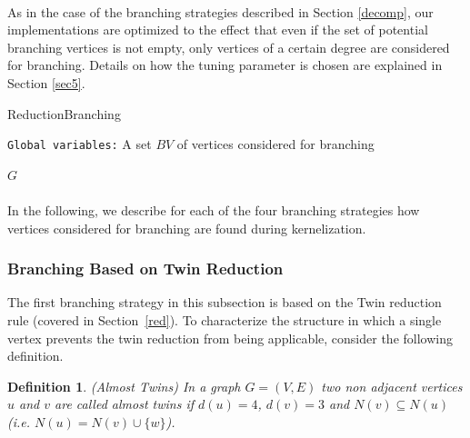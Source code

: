 \documentclass[12pt,a4paper,twoside]{scrartcl}
\newtheorem{definition}{Definition}
\numberwithin{equation}{section}
\let\oldnl\nl%
\newcommand{\nonl}{\renewcommand{\nl}{\let\nl\oldnl}}%
\begin{document}
\paragraph{}
As in the case of the branching strategies described in Section \ref{decomp}, our implementations are optimized to the effect that even if the set of potential branching vertices is not empty, only vertices of a certain degree are considered for branching. Details on how the tuning parameter is chosen are explained in Section \ref{sec5}.

\begin{algorithm}
	\caption{ReductionBranching}\label{alg:red_branch}
	\DontPrintSemicolon
	\nonl\texttt{Global variables:} A set $BV$ of vertices considered for branching\\
	
	\U{$G$}	
	
	
\end{algorithm}

\paragraph{}
In the following, we describe for each of the four branching strategies how vertices considered for branching are found during kernelization.

\subsubsection{Branching Based on Twin Reduction}
The first branching strategy in this subsection is based on the Twin reduction rule (covered in Section~\ref{red}). To characterize the structure in which a single vertex prevents the twin reduction from being applicable, consider the following definition.

\begin{definition} (Almost Twins)
	In a graph $G=(V,E)$ two non adjacent vertices $u$ and $v$ are called almost twins if $d(u) = 4$, $d(v) = 3$ and $N(v)\subseteq N(u)$ (i.e. $N(u) = N(v) \cup \{w\}$). 
\end{definition}
\end{document}

